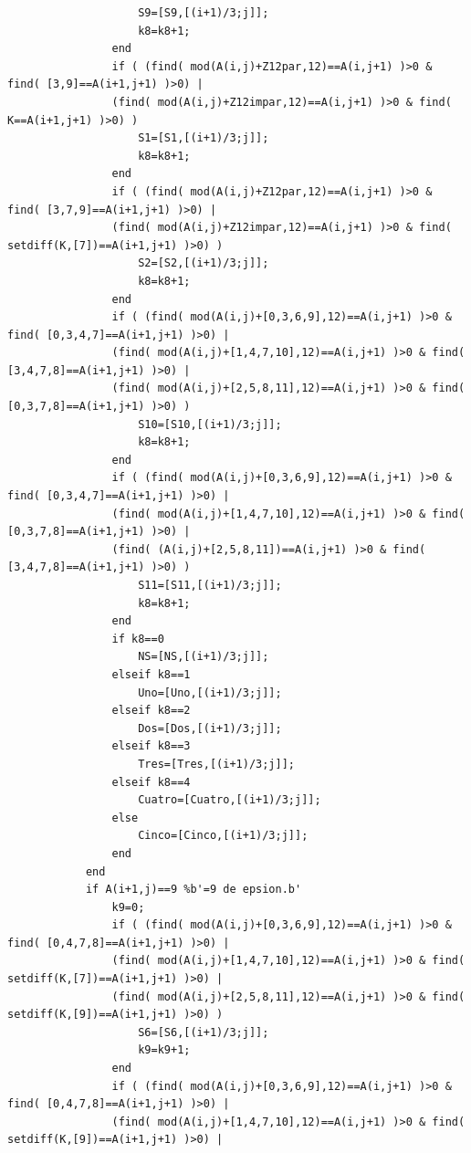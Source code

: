\documentclass[letterpaper,12pt]{book}
\theoremstyle{definition} \newtheorem{Def}{Definición}[chapter]
\theoremstyle{definition} \newtheorem{Teo}{Teorema}[chapter]
\theoremstyle{definition} \newtheorem{Pro}{Proposición}[chapter]
\theoremstyle{definition} \newtheorem{Lema}{Lema}[chapter]
\begin{document}
{\begin{verbatim}
                    S9=[S9,[(i+1)/3;j]];
                    k8=k8+1;
                end
                if ( (find( mod(A(i,j)+Z12par,12)==A(i,j+1) )>0 & find( [3,9]==A(i+1,j+1) )>0) | 
                (find( mod(A(i,j)+Z12impar,12)==A(i,j+1) )>0 & find( K==A(i+1,j+1) )>0) )
                    S1=[S1,[(i+1)/3;j]];
                    k8=k8+1;
                end    
                if ( (find( mod(A(i,j)+Z12par,12)==A(i,j+1) )>0 & find( [3,7,9]==A(i+1,j+1) )>0) | 
                (find( mod(A(i,j)+Z12impar,12)==A(i,j+1) )>0 & find( setdiff(K,[7])==A(i+1,j+1) )>0) )
                    S2=[S2,[(i+1)/3;j]];
                    k8=k8+1;
                end
                if ( (find( mod(A(i,j)+[0,3,6,9],12)==A(i,j+1) )>0 & find( [0,3,4,7]==A(i+1,j+1) )>0) | 
                (find( mod(A(i,j)+[1,4,7,10],12)==A(i,j+1) )>0 & find( [3,4,7,8]==A(i+1,j+1) )>0) | 
                (find( mod(A(i,j)+[2,5,8,11],12)==A(i,j+1) )>0 & find( [0,3,7,8]==A(i+1,j+1) )>0) )
                    S10=[S10,[(i+1)/3;j]];
                    k8=k8+1;
                end
                if ( (find( mod(A(i,j)+[0,3,6,9],12)==A(i,j+1) )>0 & find( [0,3,4,7]==A(i+1,j+1) )>0) | 
                (find( mod(A(i,j)+[1,4,7,10],12)==A(i,j+1) )>0 & find( [0,3,7,8]==A(i+1,j+1) )>0) | 
                (find( (A(i,j)+[2,5,8,11])==A(i,j+1) )>0 & find( [3,4,7,8]==A(i+1,j+1) )>0) )
                    S11=[S11,[(i+1)/3;j]];
                    k8=k8+1;
                end   
                if k8==0
                    NS=[NS,[(i+1)/3;j]];
                elseif k8==1
                    Uno=[Uno,[(i+1)/3;j]];
                elseif k8==2
                    Dos=[Dos,[(i+1)/3;j]]; 
                elseif k8==3
                    Tres=[Tres,[(i+1)/3;j]];
                elseif k8==4
                    Cuatro=[Cuatro,[(i+1)/3;j]];
                else
                    Cinco=[Cinco,[(i+1)/3;j]];
                end     
            end    
            if A(i+1,j)==9 %b'=9 de epsion.b'
                k9=0;
                if ( (find( mod(A(i,j)+[0,3,6,9],12)==A(i,j+1) )>0 & find( [0,4,7,8]==A(i+1,j+1) )>0) | 
                (find( mod(A(i,j)+[1,4,7,10],12)==A(i,j+1) )>0 & find( setdiff(K,[7])==A(i+1,j+1) )>0) | 
                (find( mod(A(i,j)+[2,5,8,11],12)==A(i,j+1) )>0 & find( setdiff(K,[9])==A(i+1,j+1) )>0) )
                    S6=[S6,[(i+1)/3;j]];
                    k9=k9+1;
                end
                if ( (find( mod(A(i,j)+[0,3,6,9],12)==A(i,j+1) )>0 & find( [0,4,7,8]==A(i+1,j+1) )>0) | 
                (find( mod(A(i,j)+[1,4,7,10],12)==A(i,j+1) )>0 & find( setdiff(K,[9])==A(i+1,j+1) )>0) | 

\end{verbatim}}
\end{document}
